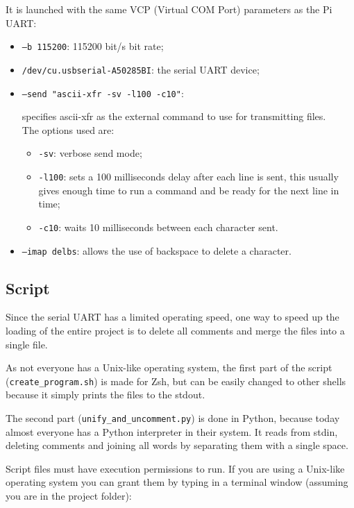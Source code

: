 \documentclass[a4paper, 12pt]{article}
\begin{document}
It is launched with the same VCP (Virtual COM Port) parameters as the Pi UART:
\begin{itemize}
    \item \texttt{--b 115200}: 115200 bit/s bit rate;
    \item \texttt{/dev/cu.usbserial-A50285BI}: the serial UART device;
    \item \texttt{--send "ascii-xfr -sv -l100 -c10"}:
    
    specifies ascii-xfr as the external
    command to use for transmitting files. \\
    The options used are: 
    \begin{itemize}
        \item \texttt{-sv}: verbose send mode;
        \item \texttt{-l100}: sets a 100 milliseconds delay after each line is sent,
        this usually gives enough time to run a command and be
        ready for the next line in time;
        \item \texttt{-c10}: waits 10 milliseconds between each character sent.
    \end{itemize}
    \item \texttt{--imap delbs}: allows the use of backspace to delete a character.
\end{itemize}

\subsection{Script}
Since the serial UART has a limited operating speed, one way to speed up the loading of the entire project is to delete all comments and merge the files into a single file.

As not everyone has a Unix-like operating system, the first part of the script (\texttt{create\_program.sh}) is made for Zsh, but can be easily changed to other shells because it simply prints the files to the stdout. 



The second part (\texttt{unify\_and\_uncomment.py}) is done in Python, because today almost everyone has a Python interpreter in their system. It reads from stdin, deleting comments and joining all words by separating them with a single space.



Script files must have execution permissions to run. If you are using a Unix-like operating system you can grant them by typing in a terminal window (assuming you are in the project folder):
\end{document}
